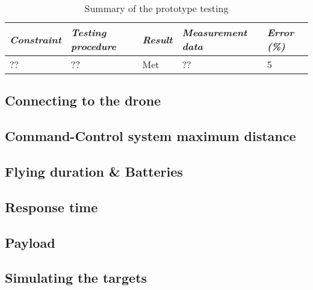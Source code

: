 \documentclass[../main.tex]{subfiles}
\begin{document}
\begin{table}[H]
    \centering
    \caption{Summary of the prototype testing}
    \label{tab:testing-summary}
    \begin{tabularx}{\textwidth}{ l X l l l }
        \toprule
        \textit{Constraint} 
            & \textit{Testing procedure} 
                & \textit{Result}
        & \textit{Measurement data} 
            & \textit{Error (\%)} \\

        \midrule
        
        
        ??    & ?? 
        & Met
            & ??
        & 5 \\

        \bottomrule		
    \end{tabularx}
\end{table}


\subsection{Connecting to the drone}

\lipsum[1]

\subsection{Command-Control system maximum distance}

\lipsum[1]

\subsection{Flying duration \& Batteries}

\lipsum[1]

\subsection{Response time}

\lipsum[1]

\subsection{Payload}

\lipsum[1]

\subsection{Simulating the targets}
\end{document}
